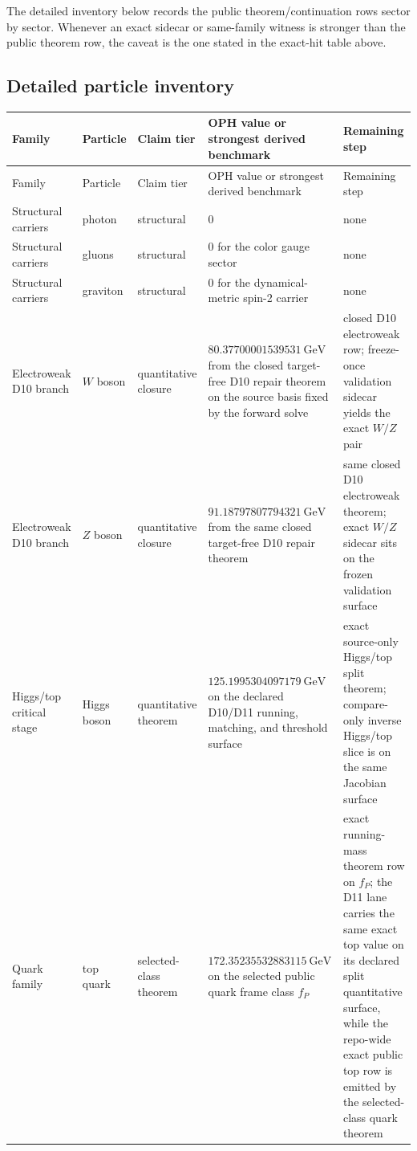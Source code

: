 \documentclass[11pt]{article}
\begin{document}
The detailed inventory below records the public theorem/continuation rows sector by sector. Whenever an exact sidecar or same-family witness is stronger than the public theorem row, the caveat is the one stated in the exact-hit table above.

\subsection{Detailed particle inventory}

\tiny
\setlength{\tabcolsep}{2pt}
\begin{longtable}{@{}>{\raggedright\arraybackslash}p{}>{\raggedright\arraybackslash}p{}>{\raggedright\arraybackslash}p{}>{\raggedright\arraybackslash}p{}>{\raggedright\arraybackslash}p{}@{}}
\toprule
Family & Particle & Claim tier & OPH value or strongest derived benchmark & Remaining step \\
\midrule
\endfirsthead
\toprule
Family & Particle & Claim tier & OPH value or strongest derived benchmark & Remaining step \\
\midrule
\endhead
\bottomrule
\endfoot
Structural carriers & photon & structural & \(0\) & none \\
Structural carriers & gluons & structural & \(0\) for the color gauge sector & none \\
Structural carriers & graviton & structural & \(0\) for the dynamical-metric spin-2 carrier & none \\
Electroweak D10 branch & \(W\) boson & quantitative closure & \(80.37700001539531~\mathrm{GeV}\) from the closed target-free D10 repair theorem on the source basis fixed by the forward solve & closed D10 electroweak row; freeze-once validation sidecar yields the exact \(W/Z\) pair \\
Electroweak D10 branch & \(Z\) boson & quantitative closure & \(91.18797807794321~\mathrm{GeV}\) from the same closed target-free D10 repair theorem & same closed D10 electroweak theorem; exact \(W/Z\) sidecar sits on the frozen validation surface \\
Higgs/top critical stage & Higgs boson & quantitative theorem & \(125.1995304097179~\mathrm{GeV}\) on the declared D10/D11 running, matching, and threshold surface & exact source-only Higgs/top split theorem; compare-only inverse Higgs/top slice is on the same Jacobian surface \\
Quark family & top quark & selected-class theorem & \(172.35235532883115~\mathrm{GeV}\) on the selected public quark frame class \(f_P\) & exact running-mass theorem row on \(f_P\); the D11 lane carries the same exact top value on its declared split quantitative surface, while the repo-wide exact public top row is emitted by the selected-class quark theorem \\

\end{longtable}
\end{document}
